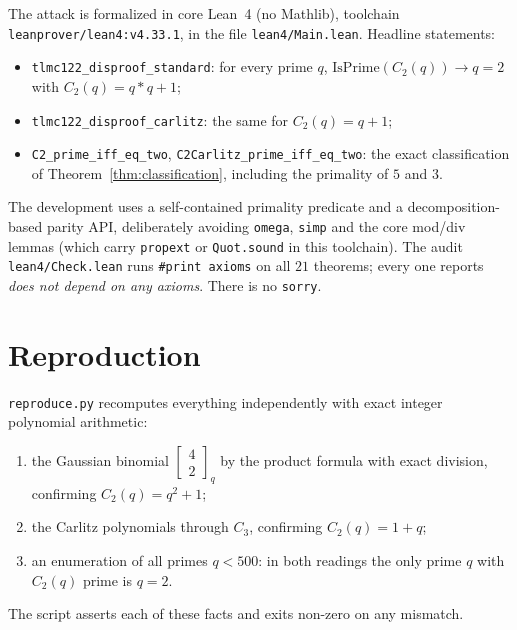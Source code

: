 \documentclass[11pt]{article}
\begin{document}
The attack is formalized in core Lean~4 (no Mathlib), toolchain
\texttt{leanprover/lean4:v4.33.1}, in the file \texttt{lean4/Main.lean}.
Headline statements:
\begin{itemize}
  \item \texttt{tlmc122\_disproof\_standard}: for every prime $q$,
        $\mathrm{IsPrime}(C_2(q)) \to q = 2$ with $C_2(q) = q*q + 1$;
  \item \texttt{tlmc122\_disproof\_carlitz}: the same for $C_2(q) = q + 1$;
  \item \texttt{C2\_prime\_iff\_eq\_two}, \texttt{C2Carlitz\_prime\_iff\_eq\_two}:
        the exact classification of Theorem~\ref{thm:classification},
        including the primality of $5$ and $3$.
\end{itemize}
The development uses a self-contained primality predicate and a
decomposition-based parity API, deliberately avoiding \texttt{omega},
\texttt{simp} and the core mod/div lemmas (which carry \texttt{propext} or
\texttt{Quot.sound} in this toolchain). The audit \texttt{lean4/Check.lean}
runs \texttt{\#print axioms} on all $21$ theorems; every one reports
\emph{does not depend on any axioms}. There is no \texttt{sorry}.

\section{Reproduction}

\texttt{reproduce.py} recomputes everything independently with exact integer
polynomial arithmetic:
\begin{enumerate}
  \item the Gaussian binomial $\begin{bmatrix} 4 \\ 2 \end{bmatrix}_q$ by the
        product formula with exact division, confirming $C_2(q) = q^2+1$;
  \item the Carlitz polynomials through $C_3$, confirming
        $C_2(q) = 1+q$;
  \item an enumeration of all primes $q < 500$: in both readings the only
        prime $q$ with $C_2(q)$ prime is $q = 2$.
\end{enumerate}
The script asserts each of these facts and exits non-zero on any mismatch.
\end{document}
